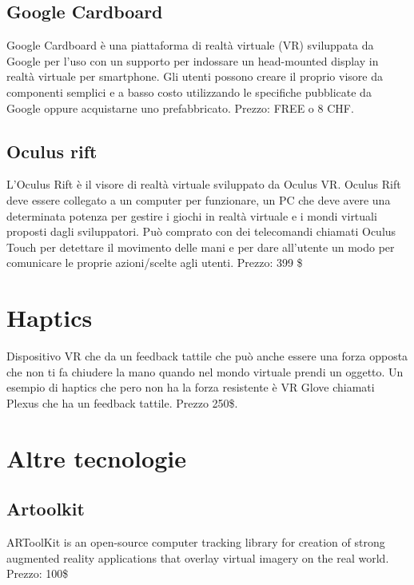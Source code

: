 \documentclass[8pt]{extarticle}
\begin{document}
\begin{multicols}{3}
\subsection{Google Cardboard}
Google Cardboard è una piattaforma di realtà virtuale (VR) sviluppata da Google per l'uso con un supporto per indossare un head-mounted display in realtà virtuale per smartphone.  Gli utenti possono creare il proprio visore da componenti semplici e a basso costo utilizzando le specifiche pubblicate da Google oppure acquistarne uno prefabbricato. 
Prezzo: FREE o 8 CHF.
\subsection{Oculus rift}
L'Oculus Rift è il visore di realtà virtuale sviluppato da Oculus VR. Oculus Rift deve essere collegato a un computer per funzionare, un PC che deve avere una determinata potenza per gestire i giochi in realtà virtuale e i mondi virtuali proposti dagli sviluppatori. 
Può comprato con dei telecomandi chiamati Oculus Touch per detettare il movimento delle mani e per dare all’utente un modo per comunicare le proprie azioni/scelte agli utenti.
Prezzo: 399 \$
\section{Haptics}
Dispositivo VR che da un feedback tattile che può anche essere una forza opposta che non ti fa chiudere la mano quando nel mondo virtuale prendi un oggetto.
Un esempio di haptics che pero non ha la forza resistente è VR Glove chiamati Plexus che ha un feedback tattile. Prezzo 250\$.
\section{Altre tecnologie}
\subsection{Artoolkit}
ARToolKit is an open-source computer tracking library for creation of strong augmented reality applications that overlay virtual imagery on the real world.
Prezzo: 100\$





\end{multicols}
\end{document}
